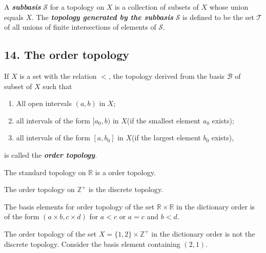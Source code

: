 \begin{mydefinition}
A \textbf{\emph{subbasis}} $\mathcal{S}$ for a topology on $X$ is a collection of subsets of $X$ whose union equals $X$. The \textbf{\emph{topology generated by the subbasis}} $\mathcal{S}$ is defined to be the set $\mathcal{T}$ of all unions of finite intersections of elements of $\mathcal{S}$.
\end{mydefinition}

\subsection{14. The order topology}
\begin{mydefinition}
If $X$ is a set with the relation $<$, the topology derived from the basis $\mathcal{B}$ of subset of $X$ such that
\begin{enumerate}[label={(\alph*)}]
\item All open intervals $(a,b)$ in $X$;
\item all intervals of the form $[a_0,b)$ in $X$(if the smallest element $a_0$ exists);
\item all intervals of the form $[a,b_0]$ in $X$(if the largest element $b_0$ exists),
\end{enumerate}
is called the \textbf{\emph{order topology}}.
\end{mydefinition}
\begin{example}
The standard topology on $\mathbb{R}$ is a order topology.
\end{example}
\begin{example}
The order topology on $\mathbb{Z}^+$ is the discrete topology.
\end{example}
\begin{example}
The basis elements for order topology of the set $\mathbb{R}\times \mathbb{R}$ in the dictionary order is of the form $(a\times b, c\times d)$ for $a<c$ or $a=c$ and $b<d$.
\end{example}
\begin{example}
The order topology of the set $X=\{1,2\}\times \mathbb{Z}^+$ in the dictionary order is not the discrete topology. Consider the basis element containing $(2,1)$.
\end{example}

